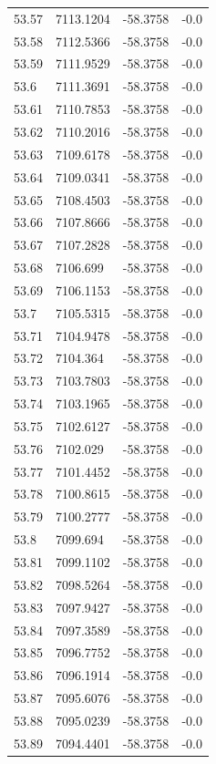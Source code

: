 \begin{table}[H]
\begin{tabular}{llll}
53.57 & 7113.1204 & -58.3758 & -0.0 \\
53.58 & 7112.5366 & -58.3758 & -0.0 \\
53.59 & 7111.9529 & -58.3758 & -0.0 \\
53.6 & 7111.3691 & -58.3758 & -0.0 \\
53.61 & 7110.7853 & -58.3758 & -0.0 \\
53.62 & 7110.2016 & -58.3758 & -0.0 \\
53.63 & 7109.6178 & -58.3758 & -0.0 \\
53.64 & 7109.0341 & -58.3758 & -0.0 \\
53.65 & 7108.4503 & -58.3758 & -0.0 \\
53.66 & 7107.8666 & -58.3758 & -0.0 \\
53.67 & 7107.2828 & -58.3758 & -0.0 \\
53.68 & 7106.699 & -58.3758 & -0.0 \\
53.69 & 7106.1153 & -58.3758 & -0.0 \\
53.7 & 7105.5315 & -58.3758 & -0.0 \\
53.71 & 7104.9478 & -58.3758 & -0.0 \\
53.72 & 7104.364 & -58.3758 & -0.0 \\
53.73 & 7103.7803 & -58.3758 & -0.0 \\
53.74 & 7103.1965 & -58.3758 & -0.0 \\
53.75 & 7102.6127 & -58.3758 & -0.0 \\
53.76 & 7102.029 & -58.3758 & -0.0 \\
53.77 & 7101.4452 & -58.3758 & -0.0 \\
53.78 & 7100.8615 & -58.3758 & -0.0 \\
53.79 & 7100.2777 & -58.3758 & -0.0 \\
53.8 & 7099.694 & -58.3758 & -0.0 \\
53.81 & 7099.1102 & -58.3758 & -0.0 \\
53.82 & 7098.5264 & -58.3758 & -0.0 \\
53.83 & 7097.9427 & -58.3758 & -0.0 \\
53.84 & 7097.3589 & -58.3758 & -0.0 \\
53.85 & 7096.7752 & -58.3758 & -0.0 \\
53.86 & 7096.1914 & -58.3758 & -0.0 \\
53.87 & 7095.6076 & -58.3758 & -0.0 \\
53.88 & 7095.0239 & -58.3758 & -0.0 \\
53.89 & 7094.4401 & -58.3758 & -0.0 \\

\end{tabular}
\end{table}
